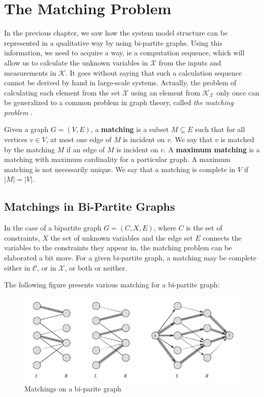 \chapter{The Matching Problem}

In the previous chapter, we saw how the system model structure can be represented in a qualitative way by using bi-partite graphs. Using this information, we need to acquire a way, ie a computation sequence, which will allow us to calculate the unknown variables in $\mathcal{X}$ from the inputs and measurements in $\mathcal{K}$. It goes without saying that such a calculation sequence cannot be derived by hand in large-scale systems. Actually, the problem of calculating each element from the set $\mathcal{X}$ using an element from $\mathcal{K_X}$ only once can be generalized to a common problem in graph theory, called \emph{the matching problem} \cite[ch~26]{Leiserson2009}.

Given a graph $G=(V,E)$, a \textbf{matching} is a subset $M\subseteq E$ such that for all vertices $v \in V$, at most one edge of $M$ is incident on $v$. We say that $v$ is matched by the matching $M$ if an edge of $M$ is incident on $v$. A \textbf{maximum matching} is a matching with maximum cardinality for a particular graph. A maximum matching is not necessarily unique. We say that a matching is complete in $V$ if $\left|M\right|=\left|V\right|$.

\section{Matchings in Bi-Partite Graphs}

In the case of a bipartite graph $G = (C,X,E)$, where $C$ is the set of constraints, $X$ the set of unknown variables and the edge set $E$ connects the variables to the constraints they appear in, the matching problem can be elaborated a bit more. For a given bi-partite graph, a matching may be complete either in $\mathcal{C}$, or in $\mathcal{X}$, or both or neither.

The following figure presents various matching for a bi-partite graph:
\begin{figure}[H]
\centering
\includegraphics[width=0.7\linewidth]{Figures/matching}
\caption{Matchings on a bi-parite graph}
\label{fig:bipariteMatching}
\end{figure}

